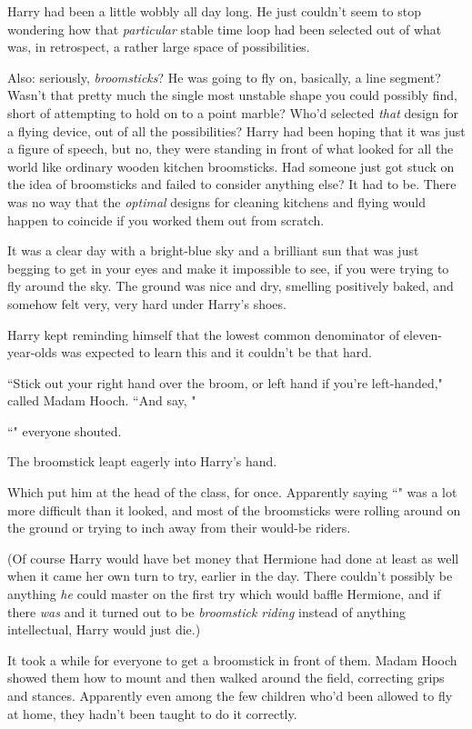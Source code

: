 Harry had been a little wobbly all day long. He just couldn't seem to stop wondering how that \emph{particular} stable time loop had been selected out of what was, in retrospect, a rather large space of possibilities.

Also: seriously, \emph{broomsticks}? He was going to fly on, basically, a line segment? Wasn't that pretty much the single most unstable shape you could possibly find, short of attempting to hold on to a point marble? Who'd selected \emph{that} design for a flying device, out of all the possibilities? Harry had been hoping that it was just a figure of speech, but no, they were standing in front of what looked for all the world like ordinary wooden kitchen broomsticks. Had someone just got stuck on the idea of broomsticks and failed to consider anything else? It had to be. There was no way that the \emph{optimal} designs for cleaning kitchens and flying would happen to coincide if you worked them out from scratch.

It was a clear day with a bright-blue sky and a brilliant sun that was just begging to get in your eyes and make it impossible to see, if you were trying to fly around the sky. The ground was nice and dry, smelling positively baked, and somehow felt very, very hard under Harry's shoes.

Harry kept reminding himself that the lowest common denominator of eleven-year-olds was expected to learn this and it couldn't be that hard.

``Stick out your right hand over the broom, or left hand if you're left-handed," called Madam Hooch. ``And say, "

``" everyone shouted.

The broomstick leapt eagerly into Harry's hand.

Which put him at the head of the class, for once. Apparently saying ``" was a lot more difficult than it looked, and most of the broomsticks were rolling around on the ground or trying to inch away from their would-be riders.

(Of course Harry would have bet money that Hermione had done at least as well when it came her own turn to try, earlier in the day. There couldn't possibly be anything \emph{he} could master on the first try which would baffle Hermione, and if there \emph{was} and it turned out to be \emph{broomstick riding} instead of anything intellectual, Harry would just die.)

It took a while for everyone to get a broomstick in front of them. Madam Hooch showed them how to mount and then walked around the field, correcting grips and stances. Apparently even among the few children who'd been allowed to fly at home, they hadn't been taught to do it correctly.

